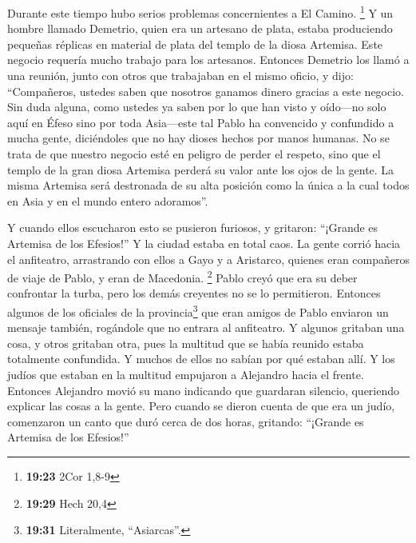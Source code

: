  Durante este tiempo hubo serios problemas concernientes
a El Camino. \footnote{\textbf{19:23} 2Cor 1,8-9}  Y un
hombre llamado Demetrio, quien era un artesano de plata, estaba
produciendo pequeñas réplicas en material de plata del templo de la
diosa Artemisa. Este negocio requería mucho trabajo para los artesanos.
 Entonces Demetrio los llamó a una reunión, junto con
otros que trabajaban en el mismo oficio, y dijo: ``Compañeros, ustedes
saben que nosotros ganamos dinero gracias a este negocio.
 Sin duda alguna, como ustedes ya saben por lo que han
visto y oído---no solo aquí en Éfeso sino por toda Asia---este tal Pablo
ha convencido y confundido a mucha gente, diciéndoles que no hay dioses
hechos por manos humanas.  No se trata de que nuestro
negocio esté en peligro de perder el respeto, sino que el templo de la
gran diosa Artemisa perderá su valor ante los ojos de la gente. La misma
Artemisa será destronada de su alta posición como la única a la cual
todos en Asia y en el mundo entero adoramos''.

 Y cuando ellos escucharon esto se pusieron furiosos, y
gritaron: ``¡Grande es Artemisa de los Efesios!''  Y la
ciudad estaba en total caos. La gente corrió hacia el anfiteatro,
arrastrando con ellos a Gayo y a Aristarco, quienes eran compañeros de
viaje de Pablo, y eran de Macedonia. \footnote{\textbf{19:29} Hech 20,4}
 Pablo creyó que era su deber confrontar la turba, pero
los demás creyentes no se lo permitieron.  Entonces
algunos de los oficiales de la provincia\footnote{\textbf{19:31}
  Literalmente, ``Asiarcas''.} que eran amigos de Pablo enviaron un
mensaje también, rogándole que no entrara al anfiteatro. 
Y algunos gritaban una cosa, y otros gritaban otra, pues la multitud que
se había reunido estaba totalmente confundida. Y muchos de ellos no
sabían por qué estaban allí.  Y los judíos que estaban en
la multitud empujaron a Alejandro hacia el frente. Entonces Alejandro
movió su mano indicando que guardaran silencio, queriendo explicar las
cosas a la gente.  Pero cuando se dieron cuenta de que
era un judío, comenzaron un canto que duró cerca de dos horas, gritando:
``¡Grande es Artemisa de los Efesios!''

